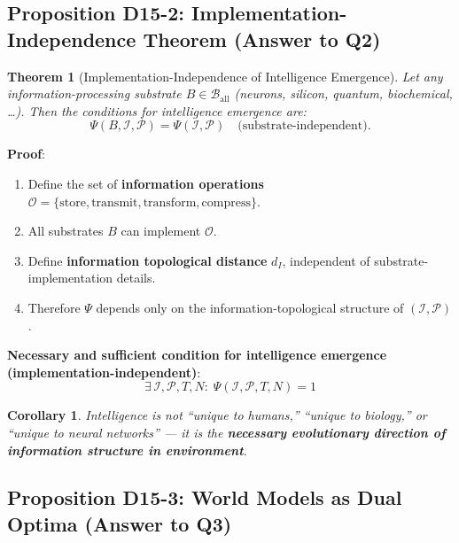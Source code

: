 \documentclass[12pt, a4paper]{article}
\newtheorem{theorem}{Theorem}[section]
\newtheorem{corollary}{Corollary}[section]
\newcommand{\calI}{\mathcal{I}}
\newcommand{\calP}{\mathcal{P}}
\newcommand{\calO}{\mathcal{O}}
\newcommand{\calB}{\mathcal{B}}
\begin{document}
\subsection{Proposition D15-2: Implementation-Independence Theorem (Answer to Q2)}\label{sec:theorem2}

\begin{theorem}[Implementation-Independence of Intelligence Emergence]\label{thm:independence}
Let any information-processing substrate $B \in \calB_{\text{all}}$ (neurons, silicon, quantum, biochemical, \ldots). Then the conditions for intelligence emergence are:
\begin{equation}
\Psi(B,\calI,\calP) = \Psi(\calI,\calP) \quad \text{(substrate-independent)}.
\end{equation}
\end{theorem}

\noindent\textbf{Proof}:
\begin{enumerate}
\item Define the set of \textbf{information operations} $\calO = \{\text{store}, \text{transmit}, \text{transform}, \text{compress}\}$.
\item All substrates $B$ can implement $\calO$.
\item Define \textbf{information topological distance} $d_I$, independent of substrate-implementation details.
\item Therefore $\Psi$ depends only on the information-topological structure of $(\calI,\calP)$.
\end{enumerate}

\noindent\textbf{Necessary and sufficient condition for intelligence emergence (implementation-independent)}:
\begin{equation}
\boxed{\exists\,\calI,\calP,T,N: \;\Psi(\calI,\calP,T,N) = 1}
\end{equation}

\begin{corollary}\label{cor:independence-impl}
Intelligence is not ``unique to humans,'' ``unique to biology,'' or ``unique to neural networks'' --- it is the \textbf{necessary evolutionary direction of information structure in environment}.
\end{corollary}

\subsection{Proposition D15-3: World Models as Dual Optima (Answer to Q3)}\label{sec:theorem3}
\end{document}
